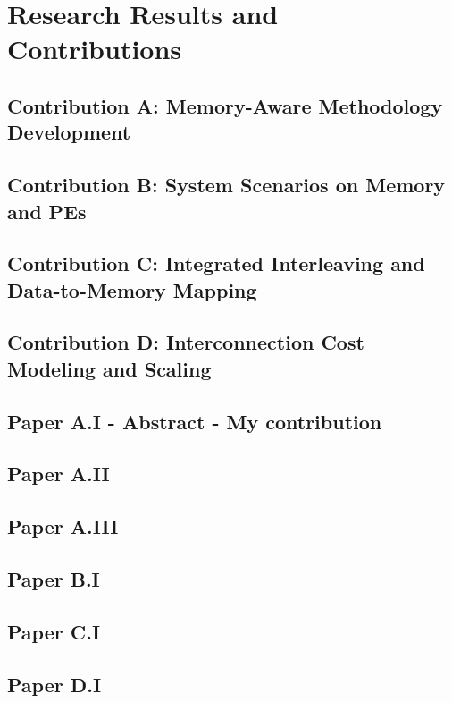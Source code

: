 \chapter{Research Results and Contributions}
\label{research}

\section{Contribution A: Memory-Aware Methodology Development}

\section{Contribution B: System Scenarios on Memory and PEs}

\section{Contribution C: Integrated Interleaving and Data-to-Memory Mapping}

\section{Contribution D: Interconnection Cost Modeling and Scaling}

\section{Paper A.I - Abstract - My contribution}

\section{Paper A.II}

\section{Paper A.III}

\section{Paper B.I}

\section{Paper C.I}

\section{Paper D.I}